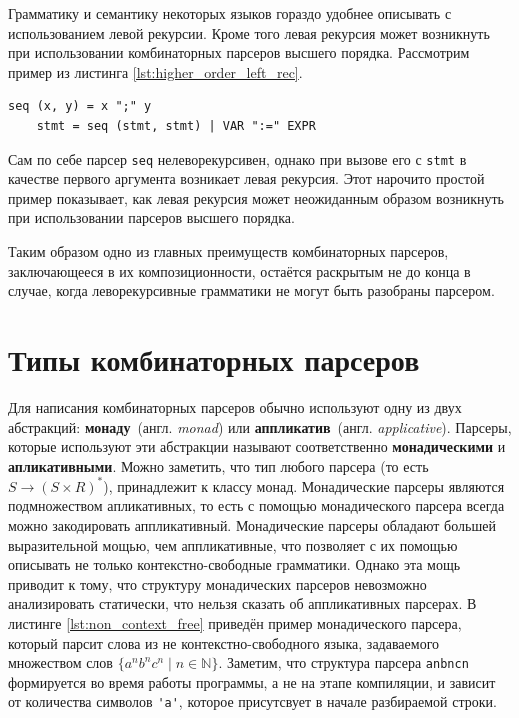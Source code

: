 \documentclass[times]{itmo-student-thesis}
\begin{document}
Грамматику и семантику некоторых языков гораздо удобнее описывать с использованием левой рекурсии. Кроме того
левая рекурсия может возникнуть при использовании комбинаторных парсеров высшего порядка. Рассмотрим пример из листинга 
\ref{lst:higher_order_left_rec}.

\begin{lstlisting}[float=!h,caption={Возникновение левой рекурсии},label={lst:higher_order_left_rec}]
    seq (x, y) = x ";" y
    stmt = seq (stmt, stmt) | VAR ":=" EXPR
\end{lstlisting}

Сам по себе парсер \lstinline{seq} нелеворекурсивен, однако при вызове его с \lstinline{stmt} в качестве первого аргумента возникает левая рекурсия.
Этот нарочито простой пример показывает, как левая рекурсия может неожиданным образом возникнуть при использовании
парсеров высшего порядка.

Таким образом одно из главных преимуществ комбинаторных парсеров, заключающееся в их композиционности, остаётся
раскрытым не до конца в случае, когда леворекурсивные грамматики не могут быть разобраны парсером.

\section{Типы комбинаторных парсеров}\label{sec:parser_combinators_types}

Для написания комбинаторных парсеров обычно используют одну из двух абстракций: \textbf{монаду}~(англ.
\textit{monad})	или \textbf{аппликатив}~(англ. \textit{applicative}). Парсеры, которые используют эти
абстракции называют соответственно  \textbf{монадическими} и \textbf{апликативными}. Можно заметить, что тип любого
парсера (то есть $S \rightarrow (S \times R)^*$),  принадлежит к классу монад\cite{hutton_monadic_nodate}. Монадические парсеры
являются подмножеством апликативных, то есть с помощью монадического парсера всегда можно закодировать аппликативный.
Монадические парсеры обладают большей выразительной мощью, чем аппликативные, что позволяет с их помощью описывать не
только	    контекстно-свободные грамматики. Однако эта мощь приводит к тому, что структуру монадических парсеров
невозможно анализировать статически, что нельзя сказать об аппликативных парсерах. В листинге \ref{lst:non_context_free}
приведён пример монадического парсера,	который парсит слова из не контекстно-свободного языка, задаваемого множеством
слов $\{a^nb^nc^n \mid n \in \mathbb{N}\}$. Заметим, что структура парсера \lstinline{anbncn} формируется во время работы
программы, а не на этапе компиляции, и зависит от количества символов \lstinline{'a'}, которое присутсвует в
начале разбираемой строки.
\end{document}
